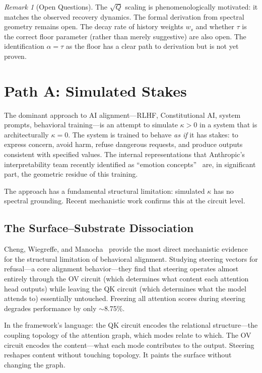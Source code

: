 \documentclass[11pt,letterpaper]{article}
\theoremstyle{remark}
\newtheorem{remark}{Remark}
\begin{document}
\begin{remark}[Open Questions]
The $\sqrt{Q}$ scaling is phenomenologically motivated: it matches the observed recovery dynamics. The formal derivation from spectral geometry remains open. The decay rate of history weights $w_s$ and whether $\tau$ is the correct floor parameter (rather than merely suggestive) are also open. The identification $\alpha = \tau$ as the floor has a clear path to derivation but is not yet proven.
\end{remark}


\section{Path A: Simulated Stakes}\label{sec:path-a}

The dominant approach to AI alignment---RLHF, Constitutional AI, system prompts, behavioral training---is an attempt to simulate $\kappa > 0$ in a system that is architecturally $\kappa = 0$. The system is trained to behave \emph{as if} it has stakes: to express concern, avoid harm, refuse dangerous requests, and produce outputs consistent with specified values. The internal representations that Anthropic's interpretability team recently identified as ``emotion concepts''~\cite{anthropic2026} are, in significant part, the geometric residue of this training.

The approach has a fundamental structural limitation: simulated $\kappa$ has no spectral grounding. Recent mechanistic work confirms this at the circuit level.

\subsection{The Surface--Substrate Dissociation}

Cheng, Wiegreffe, and Manocha~\cite{cheng2026} provide the most direct mechanistic evidence for the structural limitation of behavioral alignment. Studying steering vectors for refusal---a core alignment behavior---they find that steering operates almost entirely through the OV circuit (which determines what content each attention head outputs) while leaving the QK circuit (which determines what the model attends to) essentially untouched. Freezing all attention scores during steering degrades performance by only $\sim$8.75\%.

In the framework's language: the QK circuit encodes the relational structure---the coupling topology of the attention graph, which modes relate to which. The OV circuit encodes the content---what each mode contributes to the output. Steering reshapes content without touching topology. It paints the surface without changing the graph.
\end{document}
